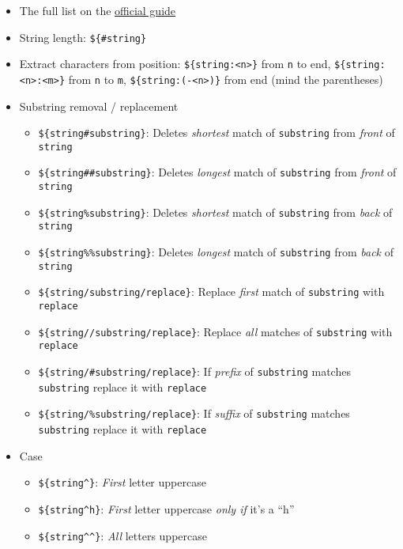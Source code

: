 \documentclass[a4paper,12pt,%
              final%
              ]{article}
\begin{document}
\begin{itemize}
    \begin{itemize}
      \item The full list on the \href{https://www.gnu.org/software/bash/manual/html_node/Shell-Parameter-Expansion.html}{official guide}
      \item String length: \verb|${#string}|
      \item Extract characters from position: \verb|${string:<n>}| from \texttt{n} to end, \verb|${string:<n>:<m>}| from \texttt{n} to \texttt{m}, \verb|${string:(-<n>)}| from end (mind the parentheses)
      \item Substring removal / replacement
        \begin{itemize}
          \item \verb|${string#substring}|: Deletes \emph{shortest} match of \texttt{substring} from \emph{front} of \texttt{string}
          \item \verb|${string##substring}|: Deletes \emph{longest} match of \texttt{substring} from \emph{front} of \texttt{string}
          \item \verb|${string%substring}|: Deletes \emph{shortest} match of \texttt{substring} from \emph{back} of \texttt{string}
          \item \verb|${string%%substring}|: Deletes \emph{longest} match of \texttt{substring} from \emph{back} of \texttt{string}
          \item \verb|${string/substring/replace}|: Replace \emph{first} match of \texttt{substring} with \texttt{replace}
          \item \verb|${string//substring/replace}|: Replace \emph{all} matches of \texttt{substring} with \texttt{replace}
          \item \verb|${string/#substring/replace}|: If \emph{prefix} of \texttt{substring} matches \texttt{substring} replace it with \texttt{replace}
          \item \verb|${string/%substring/replace}|: If \emph{suffix} of \texttt{substring} matches \texttt{substring} replace it with \texttt{replace}
        \end{itemize}
      \item Case
        \begin{itemize}
          \item \verb|${string^}|: \emph{First} letter uppercase
          \item \verb|${string^h}|: \emph{First} letter uppercase \emph{only if} it's a ``h''
          \item \verb|${string^^}|: \emph{All} letters uppercase

\end{itemize}
\end{itemize}
\end{itemize}
\end{document}
